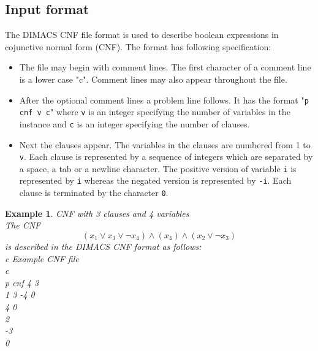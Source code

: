 \documentclass[12pt,a4paper]{article}
\newtheorem{ex}{Example}
\begin{document}
\subsection{Input format}
The DIMACS CNF file format is used to describe boolean expressions in cojunctive normal form (CNF). The format has following specification\cite{dimacs_cnf_website}:\\
\begin{itemize}
  \item The file may begin with comment lines. The first character of a comment line is a lower case "c". Comment lines may also appear throughout the file.
  \item After the optional comment lines a problem line follows. It has the format "\texttt{p cnf v c}" where \texttt{v} is an integer specifying the number of variables in the instance and \texttt{c} is an integer specifying the number of clauses.
  \item Next the clauses appear. The variables in the clauses are numbered from 1 to \texttt{v}. Each clause is represented by a sequence of integers which are separated by a space, a tab or a newline character. The positive version of variable \texttt{i} is represented by \texttt{i} whereas the negated version is represented by \texttt{-i}. Each clause is terminated by the character \texttt{0}.
\end{itemize}
\begin{ex} CNF with 3 clauses and 4 variables\\ \label{ex:1}
  The CNF
  $$ (x_1 \lor x_3 \lor \neg x_4) \land (x_4) \land (x_2 \lor \neg x_3)$$
  is described in the DIMACS CNF format as follows:\\
  c Example CNF file\\
  c\\
  p cnf 4 3\\
  1 3 -4 0\\
  4 0 \\
  2\\
  -3\\
  0
\end{ex}
\end{document}
